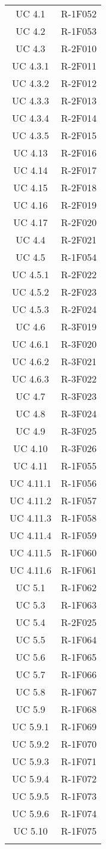 \begin{tabularx}{\textwidth}{c|c}
		UC 4.1 & R-1F052 \\
		UC 4.2 & R-1F053 \\
		UC 4.3 & R-2F010 \\
		UC 4.3.1 & R-2F011 \\
		UC 4.3.2 & R-2F012 \\
		UC 4.3.3 & R-2F013 \\
		UC 4.3.4 & R-2F014 \\
		UC 4.3.5 & R-2F015 \\
		UC 4.13 & R-2F016 \\
		UC 4.14 & R-2F017 \\
		UC 4.15 & R-2F018 \\
		UC 4.16 & R-2F019 \\
		UC 4.17 & R-2F020 \\
		UC 4.4 & R-2F021 \\
		UC 4.5 & R-1F054 \\
		UC 4.5.1 & R-2F022 \\
		UC 4.5.2 & R-2F023 \\
		UC 4.5.3 & R-2F024 \\
		UC 4.6 & R-3F019 \\
		UC 4.6.1 & R-3F020 \\
		UC 4.6.2 & R-3F021 \\
		UC 4.6.3 & R-3F022 \\
		UC 4.7 & R-3F023 \\
		UC 4.8 & R-3F024 \\
		UC 4.9 & R-3F025 \\
		UC 4.10 & R-3F026 \\
		UC 4.11 & R-1F055 \\
		UC 4.11.1 & R-1F056 \\
		UC 4.11.2 & R-1F057 \\
		UC 4.11.3 & R-1F058 \\
		UC 4.11.4 & R-1F059 \\
		UC 4.11.5 & R-1F060 \\
		UC 4.11.6 & R-1F061 \\
		UC 5.1 & R-1F062 \\
		UC 5.3 & R-1F063 \\
		UC 5.4 & R-2F025 \\
		UC 5.5 & R-1F064 \\
		UC 5.6 & R-1F065 \\
		UC 5.7 & R-1F066 \\
		UC 5.8 & R-1F067 \\
		UC 5.9 & R-1F068 \\
		UC 5.9.1 & R-1F069 \\
		UC 5.9.2 & R-1F070 \\
		UC 5.9.3 & R-1F071 \\
		UC 5.9.4 & R-1F072 \\
		UC 5.9.5 & R-1F073 \\
		UC 5.9.6 & R-1F074 \\
		UC 5.10 & R-1F075 \\
	\rowcolor{white}
	\caption{Tabella tracciamento casi d'uso-requisiti} \label{tab:tabellacasirequisiti}
\end{tabularx}



